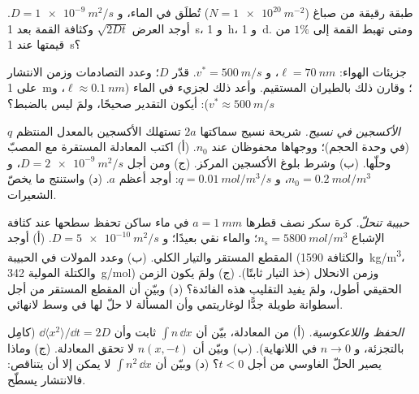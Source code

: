 \begin{exercise}[$\star$]\label{exo:b2:particle-diffusion:3}
طبقة رقيقة من صباغ ($N = \qty{1e20}{m^{-2}}$) تُطلَق في الماء،
و $D = \qty{1e-9}{m^2/s}$. أوجد العرض $\sqrt{2Dt}$ وكثافة القمة بعد
\qty{1}{s}، و \qty{1}{h}، و \qty{1}{d}. ومتى تهبط القمة إلى
$1\%$ من قيمتها عند \qty{1}{s}؟
\end{exercise}

\begin{exercise}[$\star$]\label{exo:b2:particle-diffusion:4}
جزيئات الهواء: $\ell = \qty{70}{nm}$، و $v^* = \qty{500}{m/s}$. قدّر
$D$؛ وعدد التصادمات وزمن الانتشار على \qty{1}{m}؛ وقارن ذلك
بالطيران المستقيم. وأعد ذلك لجزيء في الماء ($\ell \approx
\qty{0.1}{nm}$، و $v^* \approx \qty{500}{m/s}$): أيكون التقدير صحيحًا، ولمَ
ليس بالضبط؟
\end{exercise}

\begin{exercise}[$\star\star$]\label{exo:b2:particle-diffusion:5}
\emph{الأكسجين في نسيج.} شريحة نسيج سماكتها $2a$ تستهلك
الأكسجين بالمعدل المنتظم $q$ (في وحدة الحجم)؛ ووجهاها
محفوظان عند $n_0$. (أ) اكتب المعادلة المستقرة مع المصبّ وحلّها.
(ب) وشرط بلوغ الأكسجين المركز. (ج) ومن أجل $D = \qty{2e-9}{m^2/s}$،
و $n_0 = \qty{0.2}{mol/m^3}$، و $q = \qty{0.01}{mol/m^3/s}$: أوجد أعظم $a$. (د)
واستنتج ما يخصّ  الشعيرات.
\end{exercise}

\begin{exercise}[$\star\star$]\label{exo:b2:particle-diffusion:6}
\emph{حبيبة تنحلّ.} كرة سكر نصف قطرها $a = \qty{1}{mm}$
في ماء ساكن تحفظ سطحها عند كثافة الإشباع $n_{\text{s}}
= \qty{5800}{mol/m^3}$؛ والماء نقي بعيدًا؛ و $D =
\qty{5e-10}{m^2/s}$. (أ) أوجد المقطع المستقر والتيار الكلي. (ب)
وعدد المولات في الحبيبة (والكثافة \qty{1590}{kg/m^3}، والكتلة المولية
\qty{342}{g/mol}) وزمن الانحلال (خذ التيار ثابتًا).
(ج) ولمَ يكون الزمن الحقيقي أطول، ولمَ يفيد التقليب هذه الفائدة؟
(د) وبيّن أن المقطع المستقر من أجل أسطوانة طويلة جدًّا
لوغاريتمي وأن المسألة لا حلّ لها في وسط لانهائي.
\end{exercise}

\begin{exercise}[$\star\star$]\label{exo:b2:particle-diffusion:7}
\emph{الحفظ واللاعكوسية.} (أ) من المعادلة، بيّن
أن $\int n\,\dd x$ ثابت وأن $\dd\langle x^2\rangle/\dd t =
2D$ (كامِل بالتجزئة، و $n \to 0$ في اللانهاية). (ب) وبيّن أن
$n(x,-t)$ لا تحقق المعادلة. (ج) وماذا يصير الحلّ
الغاوسي من أجل $t < 0$؟ (د) وبيّن أن $\int n^2\,\dd x$ لا يمكن إلا أن
يتناقص: فالانتشار يسطّح.
\end{exercise}


